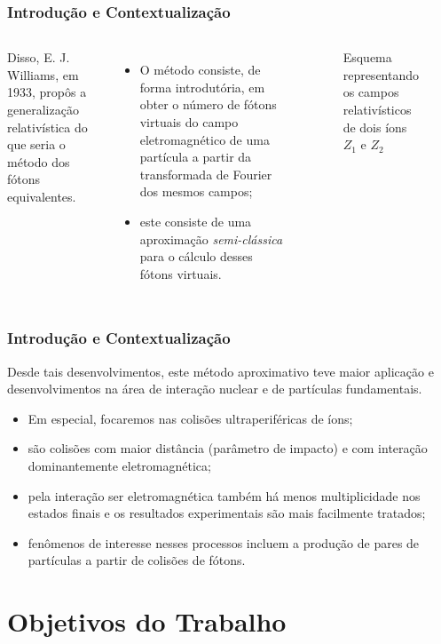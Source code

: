 \documentclass[xcolor=dvipsnames]{beamer}
\begin{document}
\begin{frame}
	\frametitle{Introdução e Contextualização}
	\begin{columns}
		Disso, E. J. Williams, em 1933, propôs a generalização relativística do que
		seria o método dos fótons equivalentes.
		\begin{itemize}
			\item O método consiste, de forma introdutória, em obter o número de 
				fótons virtuais do campo eletromagnético de uma partícula a
				partir da transformada de Fourier dos mesmos campos;
			\item este consiste de uma aproximação \textit{semi-clássica} para
				o cálculo desses fótons virtuais.
		\end{itemize}

		\begin{figure}
			
			\caption{Esquema representando os campos relativísticos de dois íons
			$Z_1$ e $Z_2$}
		\end{figure}
	\end{columns}
\end{frame}

\begin{frame}
	\frametitle{Introdução e Contextualização}
	Desde tais desenvolvimentos, este método aproximativo teve maior aplicação e
	desenvolvimentos na área de interação nuclear e de partículas fundamentais.
	\begin{itemize}
		\item Em especial, focaremos nas colisões ultraperiféricas de íons;
		\item são colisões com maior distância (parâmetro de impacto) e com
			interação dominantemente eletromagnética;
		\item pela interação ser eletromagnética também há menos multiplicidade
			nos estados finais e os resultados experimentais são mais facilmente
			tratados;
		\item fenômenos de interesse nesses processos incluem a produção de
			pares de partículas a partir de colisões de fótons.
	\end{itemize}
\end{frame}

\section{Objetivos do Trabalho}
\end{document}
